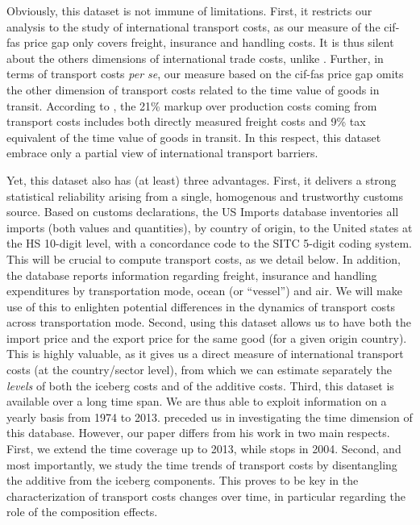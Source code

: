 \documentclass[a4paper,11pt]{article}
\begin{document}
Obviously, this dataset is not immune of limitations. First, it restricts our analysis to the study of international transport costs, as our measure of the cif-fas price gap only covers freight, insurance and handling costs. It is thus silent about the others dimensions of international trade costs, unlike \citet{Irrazabal_2015}. Further, in terms of transport costs \textit{per se}, our measure based on the cif-fas price gap omits the other dimension of transport costs related to the time value of goods in transit. According to \citet{anderson_wincoop_jel}, the 21\% markup over production costs coming from transport costs includes both directly measured freight costs and 9\% tax equivalent of the time value of goods in transit. In this respect, this dataset embrace only a partial view of international transport barriers.

Yet, this dataset also has (at least) three advantages. First, it delivers a strong statistical reliability arising from a single, homogenous and trustworthy customs source. Based on customs declarations, the US Imports database inventories all imports (both values and quantities), by country of origin, to the United states at the HS 10-digit level, with a concordance code to the SITC 5-digit coding system. This will be crucial to compute transport costs, as we detail below. In addition, the database reports information regarding freight, insurance and handling expenditures by transportation mode, ocean (or ``vessel'') and air. We will make use of this to enlighten potential differences in the dynamics of transport costs across transportation mode. Second, using this dataset allows us to have both the import price and the export price for the same good (for a given origin country). This is highly valuable, as it gives us a direct measure of international transport costs (at the country/sector level), from which we can estimate separately the \textit{levels} of both the iceberg costs and of the additive costs. Third, this dataset is available over a long time span. We are thus able to exploit information on a yearly basis from 1974 to 2013. \cite{hummels2007} preceded us in investigating the time dimension of this database. However, our paper differs from his work in two main respects. First, we extend the time coverage up to 2013, while \cite{hummels2007} stops in 2004. Second, and most importantly, we study the time trends of transport costs by disentangling the additive from the iceberg components. This proves to be key in the characterization of transport costs changes over time, in particular regarding the role of the composition effects.\smallskip
\end{document}
